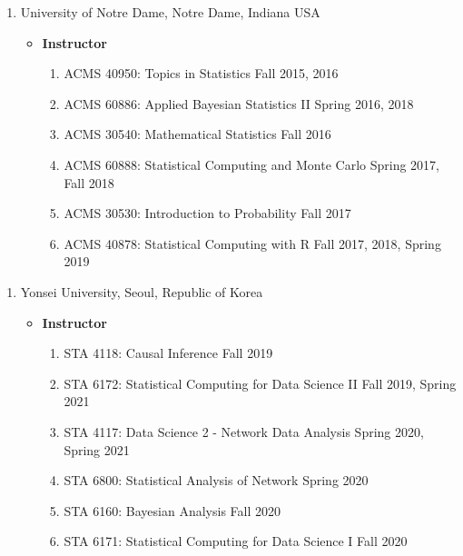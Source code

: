 \documentclass[]{book}
\providecommand{\tightlist}{%
  \setlength{\itemsep}{0pt}\setlength{\parskip}{0pt}}
\begin{document}
\begin{enumerate}
\def\labelenumi{\arabic{enumi}.}
\setcounter{enumi}{1}
\item
  University of Notre Dame, Notre Dame, Indiana USA

  \begin{itemize}
  \tightlist
  \item
    \textbf{Instructor}

    \begin{enumerate}
    \def\labelenumii{\arabic{enumii}.}
    \tightlist
    \item
      ACMS 40950: Topics in Statistics Fall 2015, 2016
    \item
      ACMS 60886: Applied Bayesian Statistics II Spring 2016, 2018
    \item
      ACMS 30540: Mathematical Statistics Fall 2016
    \item
      ACMS 60888: Statistical Computing and Monte Carlo Spring 2017, Fall 2018
    \item
      ACMS 30530: Introduction to Probability Fall 2017
    \item
      ACMS 40878: Statistical Computing with R Fall 2017, 2018, Spring 2019
    \end{enumerate}
  \end{itemize}
\end{enumerate}

\begin{enumerate}
\def\labelenumi{\arabic{enumi}.}
\setcounter{enumi}{2}
\item
  Yonsei University, Seoul, Republic of Korea

  \begin{itemize}
  \tightlist
  \item
    \textbf{Instructor}

    \begin{enumerate}
    \def\labelenumii{\arabic{enumii}.}
    \tightlist
    \item
      STA 4118: Causal Inference Fall 2019
    \item
      STA 6172: Statistical Computing for Data Science II Fall 2019, Spring 2021
    \item
      STA 4117: Data Science 2 - Network Data Analysis Spring 2020, Spring 2021
    \item
      STA 6800: Statistical Analysis of Network Spring 2020
    \item
      STA 6160: Bayesian Analysis Fall 2020
    \item
      STA 6171: Statistical Computing for Data Science I Fall 2020
    \end{enumerate}
  \end{itemize}
\end{enumerate}
\end{document}
